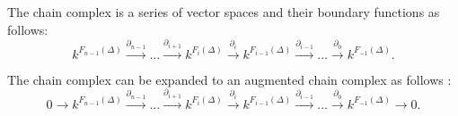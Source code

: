 \documentclass[11pt,a4paper,twoside]{report}
\begin{document}
The chain complex is a series of vector spaces and their boundary functions as follows:
\begin{equation*}
k^{F_{n-1}(\Delta)}\overset{\partial_{n-1}}{\to}\dots\overset{\partial_{i+1}}{\to} k^{F_{i}(\Delta)}\overset{\partial_{i}}{\to}k^{F_{i-1}(\Delta)}\overset{\partial_{i-1}}{\to}\dots\overset{\partial_{0}}{\to} k^{F_{-1}(\Delta)}.
\end{equation*}

The chain complex can be expanded to an augmented chain complex as follows \cite{Allgaier}:
\begin{equation*}
0\to k^{F_{n-1}(\Delta)}\overset{\partial_{n-1}}{\to}\dots\overset{\partial_{i+1}}{\to} k^{F_{i}(\Delta)}\overset{\partial_{i}}{\to}k^{F_{i-1}(\Delta)}\overset{\partial_{i-1}}{\to}\dots\overset{\partial_{0}}{\to} k^{F_{-1}(\Delta)}\to 0.
\end{equation*}
\end{document}
